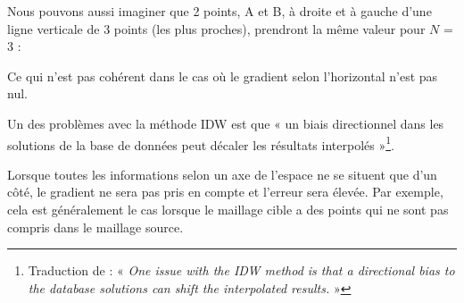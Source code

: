Nous pouvons aussi imaginer que 2 points, A et B, à droite et à gauche d'une ligne verticale de 3 points (les plus proches), prendront la même valeur pour \( N \) = 3 :

\begin{center}
\end{center}

    
Ce qui n'est pas cohérent dans le cas où le gradient selon l'horizontal n'est pas nul.

Un des problèmes avec la méthode IDW est que « un biais directionnel dans les solutions de la base de données peut décaler les résultats interpolés »\footnote{Traduction de : « \textit{One issue with the IDW method is that a directional bias to the database solutions can shift the interpolated results.} »\cite{palmer2009}}.


Lorsque toutes les informations selon un axe de l'espace ne se situent que d'un côté, le gradient ne sera pas pris en compte et l'erreur sera élevée. Par exemple, cela est généralement le cas lorsque le maillage cible a des points qui ne sont pas compris dans le maillage source.

